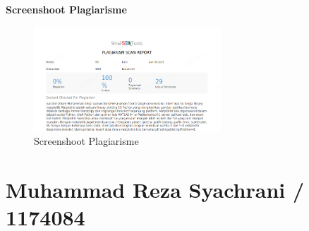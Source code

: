 \textbf{Screenshoot Plagiarisme}
\begin{figure}[ht]	
    \includegraphics[width=7cm]{figures/6/1174087/Teori/plg.png}
    \centering
    \caption{Screenshoot Plagiarisme}
\end{figure}

\section{Muhammad Reza Syachrani / 1174084}
